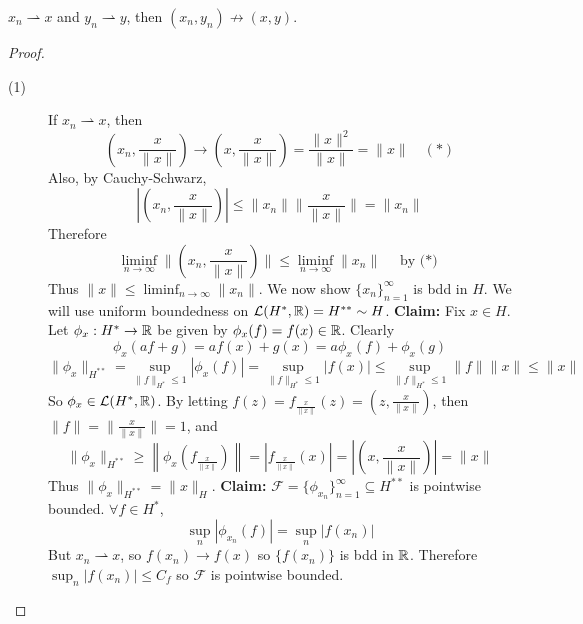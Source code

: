 \begin{rem}
    $x_n \rightharpoonup x$ and $y_n \rightharpoonup y$, then $(x_n, y_n) \not\to (x, y)$.   
\end{rem}
\begin{proof} \leavevmode
    \begin{description}
        \item[(1)]

        If $x_n \rightharpoonup x$, then
        \[
            (x_n, \frac{x}{\| x \| }) \to (x, \frac{x}{\| x \| }) = \frac{\| x \|^2 }{\| x \| } = \| x \| \quad (*)
        \]  
        Also, by Cauchy-Schwarz, 
        \[
            \left| (x_n, \frac{x}{\| x \| }) \right| \leq \| x_n \| \| \frac{x}{\| x \| } \| = \| x_n \|   
        \] 
        Therefore 
        \[
            \liminf_{n \to \infty} \| (x_n, \frac{x}{\| x \| }) \| \leq \liminf_{n \to \infty} \| x_n \| \quad \text{ by (*) }
        \] 
        Thus $\| x \| \leq \liminf_{n \to \infty} \| x_n \|  $. We now show $\{x_{n}\}_{n=1}^{\infty} $
        is bdd in $H$. We will use uniform boundedness on $\mathcal{L}(H^*, \mathbb{R}) = H^{**} \sim H$.
        \newline\textbf{Claim:} Fix $x \in H$. Let $\phi_x : H^* \to \mathbb{R}$ be given by $\phi_x(f) = f(x) \in \mathbb{R}$.
        Clearly
        \[
            \phi_x(af + g) = af(x) + g(x) = a\phi_x(f) + \phi_x(g)
        \]
        \[
            \| \phi_x \|_{H^{**}} = \sup_{\| f \|_{H^*} \leq 1} |\phi_x(f)| = \sup_{\| f \|_{H^*} \leq 1} |f(x)| \leq \sup_{\| f \|_{H^*} \leq 1} \| f \| \| x \| \leq \| x \|
        \]
        So $\phi_x \in \mathcal{L}(H^*, \mathbb{R})$. By letting $f(z) = f_{\frac{x}{\| x \| }}(z) = (z, \frac{x}{\| x \| })$,
        then $\| f \| = \| \frac{x}{\| x \| } \| = 1 $, and 
        \[
            \| \phi_x \|_{H^{**}} \geq \left\| \phi_x(f_{\frac{x}{\| x \| }}) \right\| = \left| f_{\frac{x}{\| x \| }}(x) \right| = \left| (x, \frac{x}{\| x \| }) \right| = \| x \|   
        \]     
        Thus $\| \phi_x \|_{H^{**}} = \| x \|_H $.
        \newline\textbf{Claim:} $\mathcal{F} = \{\phi_{x_n}\}_{n=1}^{\infty} \subseteq H^{**} $ is pointwise bounded.
        \newline \noindent $\forall f \in H^*$,
        \[
            \sup_{n} \left| \phi_{x_n}(f) \right| = \sup_n \left| f(x_n) \right|  
        \]  
        But $x_n \rightharpoonup x$, so $f(x_n) \to f(x)$ so $\{f(x_n) \}$ is bdd in $\mathbb{R}$. Therefore $\sup_n |f(x_n)| \leq C_f$ 
        so $\mathcal{F}$ is pointwise bounded.    
        

\end{description}
\end{proof}
